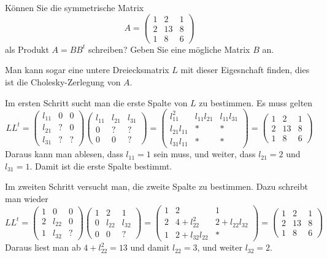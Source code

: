 Können Sie die symmetrische Matrix
\[
A=\begin{pmatrix}
1& 2&1\\
2&13&8\\
1& 8&6
\end{pmatrix}
\]
als Produkt $A=BB^t$ schreiben? Geben Sie eine mögliche Matrix $B$ an.

\begin{loesung}
Man kann sogar eine untere Dreiecksmatrix $L$ mit dieser Eigesnchaft finden,
dies ist die Cholesky-Zerlegung von $A$.

Im ersten Schritt sucht man die erste Spalte von $L$ zu bestimmen.
Es muss gelten
\[
LL^t=
\begin{pmatrix}
l_{11}&  0&  0\\
l_{21}&  ?&  0\\
l_{31}&  ?&  ?
\end{pmatrix}
\begin{pmatrix}
l_{11}&l_{21}&l_{31}\\
     0&     ?&     ?\\
     0&     0&     ?
\end{pmatrix}
=
\begin{pmatrix}
    l_{11}^2&l_{11}l_{21}&l_{11}l_{31}\\
l_{21}l_{11}&           *&           *\\
l_{31}l_{11}&           *&           *
\end{pmatrix}
=
\begin{pmatrix}
1& 2&1\\
2&13&8\\
1& 8&6
\end{pmatrix}
\]
Daraus kann man ablesen, dass $l_{11}=1$ sein muss, und weiter,
dass
$l_{21}=2$ und $l_{31}=1$. Damit ist die erste Spalte bestimmt.

Im zweiten Schritt versucht man, die zweite Spalte zu bestimmen.
Dazu schreibt man wieder
\[
LL^t
=
\begin{pmatrix}
1&     0&0\\
2&l_{22}&0\\
1&l_{32}&?
\end{pmatrix}
\begin{pmatrix}
1&     2&     1\\
0&l_{22}&l_{32}\\
0&     0&?
\end{pmatrix}
=
\begin{pmatrix}
1&2           &           1\\
2&4+l_{22}^2  &2+l_{22}l_{32}\\
1&2+l_{32}l_{22}&         *
\end{pmatrix}
=
\begin{pmatrix}
1& 2&1\\
2&13&8\\
1& 8&6
\end{pmatrix}
\]
Daraus liest man ab $4+l_{22}^2=13$ und damit $l_{22}=3$, und weiter
$l_{32}=2$.


\end{loesung}
